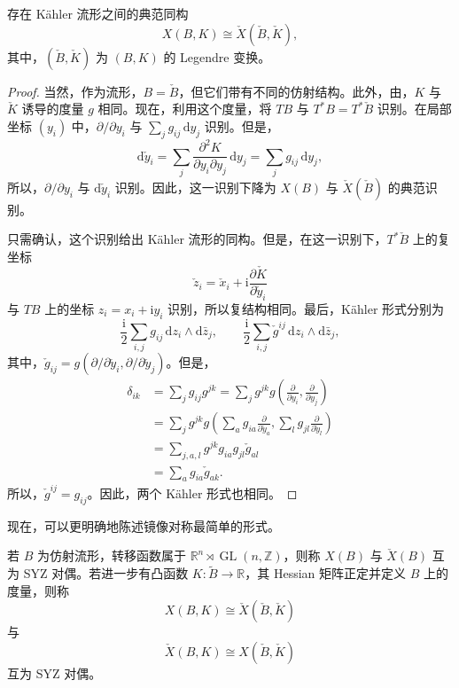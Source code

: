\begin{proposition}\label{prop:6.16}
存在 Kähler 流形之间的典范同构
\[
X(B,K)\cong\check X(\check B,\check K),
\]
其中，$(\check B,\check K)$ 为 $(B,K)$ 的 Legendre 变换。
\end{proposition}
\begin{proof}
当然，作为流形，$B=\check B$，但它们带有不同的仿射结构。此外，由，$K$ 与 $\check K$ 诱导的度量 $g$ 相同。现在，利用这个度量，将 $TB$ 与 $T^*B=T^*\check B$ 识别。在局部坐标 $(y_i)$ 中，$\partial/\partial y_i$ 与 $\sum_jg_{ij}\,\mathrm dy_j$ 识别。但是，
\[
\mathrm d\check y_i
=\sum_j\frac{\partial^2K}{\partial y_i\partial y_j}\,\mathrm dy_j
=\sum_jg_{ij}\,\mathrm dy_j,
\]
所以，$\partial/\partial y_i$ 与 $\mathrm d\check y_i$ 识别。因此，这一识别下降为 $X(B)$ 与 $\check X(\check B)$ 的典范识别。

只需确认，这个识别给出 Kähler 流形的同构。但是，在这一识别下，$T^*\check B$ 上的复坐标
\[
\check z_i=\check x_i+\mathrm i\frac{\partial\check K}{\partial\check y_i}
\]
与 $TB$ 上的坐标 $z_i=x_i+\mathrm i y_i$ 识别，所以复结构相同。最后，Kähler 形式分别为
\[
\frac{\mathrm i}{2}\sum_{i,j}g_{ij}\,\mathrm dz_i\wedge\mathrm d\bar z_j,
\qquad
\frac{\mathrm i}{2}\sum_{i,j}\check g^{ij}\,\mathrm dz_i\wedge\mathrm d\bar z_j,
\]
其中，$\check g_{ij}=g(\partial/\partial\check y_i,\partial/\partial\check y_j)$。但是，
\[
\begin{aligned}
\delta_{ik}
&=\sum_jg_{ij}g^{jk}
=\sum_jg^{jk}g\!\left(\frac{\partial}{\partial y_i},\frac{\partial}{\partial y_j}\right)\\
&=\sum_jg^{jk}g\!\left(
\sum_a g_{ia}\frac{\partial}{\partial\check y_a},
\sum_l g_{jl}\frac{\partial}{\partial\check y_l}\right)\\
&=\sum_{j,a,l}g^{jk}g_{ia}g_{jl}\check g_{al}\\
&=\sum_a g_{ia}\check g_{ak}.
\end{aligned}
\]
所以，$\check g^{ij}=g_{ij}$。因此，两个 Kähler 形式也相同。
\end{proof}

现在，可以更明确地陈述镜像对称最简单的形式。

\begin{definition}\label{def:6.17}
若 $B$ 为仿射流形，转移函数属于 $\mathbb R^n\rtimes\operatorname{GL}(n,\mathbb Z)$，则称 $X(B)$ 与 $\check X(B)$ 互为 SYZ 对偶。若进一步有凸函数 $K\colon\widetilde B\to\mathbb R$，其 Hessian 矩阵正定并定义 $B$ 上的度量，则称
\[
X(B,K)\cong\check X(\check B,\check K)
\]
与
\[
\check X(B,K)\cong X(\check B,\check K)
\]
互为 SYZ 对偶。
\end{definition}

